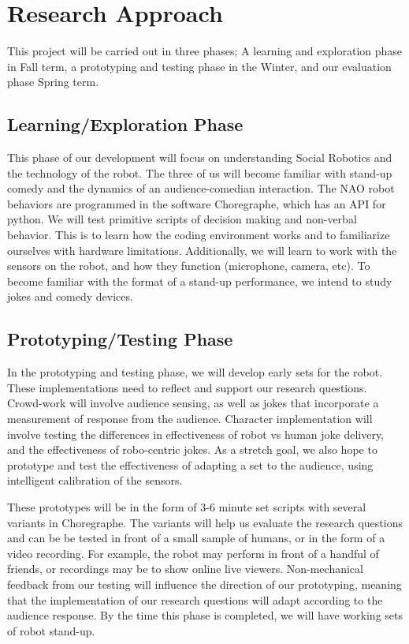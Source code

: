 \documentclass[onecolumn, draftclsnofoot,10pt, compsoc]{IEEEtran}
\begin{document}
\section{Research Approach}
This project will be carried out in three phases; A learning and exploration phase in Fall term, a prototyping and testing phase in the Winter, and our evaluation phase Spring term.

\subsection{Learning/Exploration Phase}
This phase of our development will focus on understanding Social Robotics and the technology of the robot. The three of us will become familiar with stand-up comedy and the dynamics of an audience-comedian interaction. The NAO robot behaviors are programmed in the software Choregraphe, which has an API for python. We will test primitive scripts of decision making and non-verbal behavior. This is to learn how the coding environment works and to familiarize ourselves with hardware limitations. Additionally, we will learn to work with the sensors on the robot, and how they function (microphone, camera, etc). To become familiar with the format of a stand-up performance, we intend to study jokes and comedy devices.

\subsection{Prototyping/Testing Phase}
In the prototyping and testing phase, we will develop early sets for the robot. These implementations need to reflect and support our research questions. Crowd-work will involve audience sensing, as well as jokes that incorporate a measurement of response from the audience. Character implementation will involve testing the differences in effectiveness of robot vs human joke delivery, and the effectiveness of robo-centric jokes. As a stretch goal, we also hope to prototype and test the effectiveness of adapting a set to the audience, using intelligent calibration of the sensors.

These prototypes will be in the form of 3-6 minute set scripts with several variants in Choregraphe. The variants will help us evaluate the research questions and can be be tested in front of a small sample of humans, or in the form of a video recording. For example, the robot may perform in front of a handful of friends, or recordings may be to show online live viewers. Non-mechanical feedback from our testing will influence the direction of our prototyping, meaning that the implementation of our research questions will adapt according to the audience response. By the time this phase is completed, we will have working sets of robot stand-up.
\end{document}
